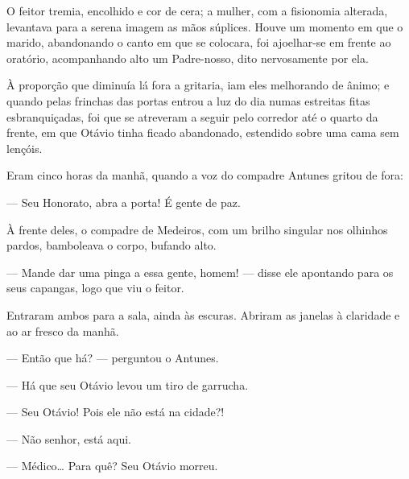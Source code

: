 {O feitor tremia, encolhido e cor de cera; a
mulher, com a fisionomia alterada, levantava para a serena imagem as
mãos súplices. Houve um momento em que o marido, abandonando o canto em
que se colocara, foi ajoelhar-se em frente ao oratório,
acompanhando alto um Padre-nosso, dito nervosamente por ela.

À proporção que diminuía lá fora a gritaria, iam eles
melhorando de ânimo; e quando pelas frinchas das portas entrou a luz do
dia numas estreitas fitas esbranquiçadas, foi que se atreveram a seguir
pelo corredor até o quarto da frente, em que Otávio tinha ficado
abandonado, estendido sobre uma cama sem lençóis.

Eram cinco horas da manhã, quando a voz do compadre Antunes
gritou de fora:

--- Seu Honorato, abra a porta! É gente de paz.


À frente deles, o compadre de Medeiros, com um brilho singular
nos olhinhos pardos, bamboleava o corpo, bufando alto.

--- Mande dar uma pinga a essa gente, homem! --- disse
ele apontando para os seus capangas, logo que viu o feitor.


Entraram ambos para a sala, ainda às escuras. Abriram
as janelas à claridade e ao ar fresco da manhã.

--- Então que há? --- perguntou o Antunes.

--- Há que seu Otávio levou um tiro de garrucha.

--- Seu Otávio! Pois ele não está na cidade?!

--- Não senhor, está aqui.


--- Médico\ldots{} Para quê? Seu Otávio morreu.



}
